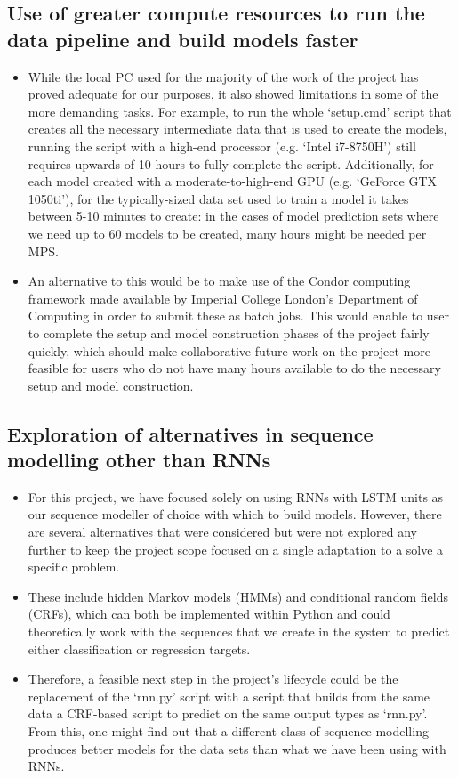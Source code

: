 \documentclass[12pt,twoside]{report}
\begin{document}
\subsection{Use of greater compute resources to run the data pipeline and build models faster}
\begin{itemize}
	\item While the local PC used for the majority of the work of the project has proved adequate for our purposes, it also showed limitations in some of the more demanding tasks. For example, to run the whole ‘setup.cmd’ script that creates all the necessary intermediate data that is used to create the models, running the script with a high-end processor (e.g. ‘Intel i7-8750H’) still requires upwards of 10 hours to fully complete the script. Additionally, for each model created with a moderate-to-high-end GPU (e.g. ‘GeForce GTX 1050ti’), for the typically-sized data set used to train a model it takes between 5-10 minutes to create: in the cases of model prediction sets where we need up to 60 models to be created, many hours might be needed per MPS.
	\item An alternative to this would be to make use of the Condor computing framework made available by Imperial College London’s Department of Computing in order to submit these as batch jobs. This would enable to user to complete the setup and model construction phases of the project fairly quickly, which should make collaborative future work on the project more feasible for users who do not have many hours available to do the necessary setup and model construction.
\end{itemize}

\subsection{Exploration of alternatives in sequence modelling other than RNNs}
\begin{itemize}
	\item For this project, we have focused solely on using RNNs with LSTM units as our sequence modeller of choice with which to build models. However, there are several alternatives that were considered but were not explored any further to keep the project scope focused on a single adaptation to a solve a specific problem.
	\item These include hidden Markov models (HMMs) and conditional random fields (CRFs), which can both be implemented within Python and could theoretically work with the sequences that we create in the system to predict either classification or regression targets.
	\item Therefore, a feasible next step in the project’s lifecycle could be the replacement of the ‘rnn.py’ script with a script that builds from the same data a CRF-based script to predict on the same output types as ‘rnn.py’. From this, one might find out that a different class of sequence modelling produces better models for the data sets than what we have been using with RNNs.
\end{itemize}
\end{document}
